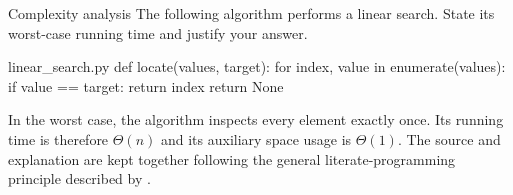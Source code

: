 \begin{problem}[5 points]{Complexity analysis}
  The following algorithm performs a linear search.
  State its worst-case running time and justify your answer.

  \begin{codebox}[python]{linear_search.py}
def locate(values, target):
    for index, value in enumerate(values):
        if value == target:
            return index
    return None
  \end{codebox}

  \begin{solution}
    In the worst case, the algorithm inspects every element exactly once.
    Its running time is therefore $\Theta(n)$ and its auxiliary space usage is $\Theta(1)$.
    The source and explanation are kept together following the general literate-programming principle described by \citet{knuth1984literate}.
  \end{solution}
\end{problem}
